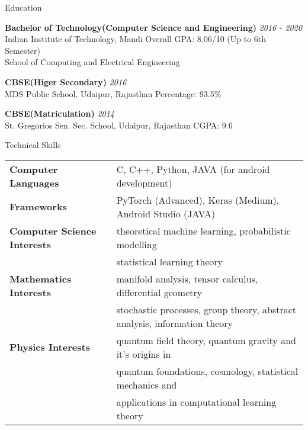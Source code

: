 \documentclass{resume} %
\begin{document}

\begin{rSection}{Education}

{\bf Bachelor of Technology(Computer Science and Engineering)} \hfill {\em 2016 - 2020} 
\\ Indian Institute of Technology, Mandi \hfill { Overall GPA: 8.06/10 (Up to 6th Semester)}
\\ School of Computing and Electrical Engineering

\smallskip

{\bf CBSE(Higer Secondary)} \hfill {\em 2016} 
\\ MDS Public School, Udaipur, Rajasthan \hfill { Percentage: 93.5\%}

\smallskip

{\bf CBSE(Matriculation)} \hfill {\em 2014} 
\\ St. Gregorios Sen. Sec. School, Udaipur, Rajasthan \hfill { CGPA: 9.6}

\end{rSection}

\begin{rSection}{Technical Skills}

\begin{tabular}{ @{} >{\bfseries}l @{\hspace{6ex}} l }
Computer Languages &  C, C++, Python, JAVA (for android development) \\
Frameworks & PyTorch (Advanced), Keras (Medium), Android Studio (JAVA) \\
Computer Science Interests & theoretical machine learning, probabilistic modelling \\ 
                  & statistical learning theory \\
Mathematics Interests & manifold analysis, tensor calculus, differential geometry \\
                  & stochastic processes, group theory, abstract analysis, information theory \\
Physics Interests & quantum field theory, quantum gravity and it's origins in \\ 
                  & quantum foundations, cosmology, statistical mechanics and \\
                  & applications in computational learning theory \\

\end{tabular}

\end{rSection}
\end{document}
